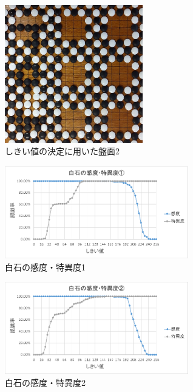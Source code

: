 \documentclass[openright]{nitocs}
\numberwithin{equation}{section}
\begin{document}
            \begin{figure}[tb] %
                \begin{center}
                \includegraphics[clip,width=60mm]{DSC_0100/boardImg.jpg} 
                \caption{しきい値の決定に用いた盤面2}
                \label{DSC0100}
                \end{center}
            \end{figure}

            \begin{figure}[tb] %
                \begin{center}
                \includegraphics[clip,width=80mm]{Case1_White_TPF_TNF.eps} 
                \caption{白石の感度・特異度1}
                \label{Case1White}
                \end{center}
            \end{figure}
            
            \begin{figure}[tb] %
                \begin{center}
                \includegraphics[clip,width=80mm]{Case2_White_TPF_TNF.eps} 
                \caption{白石の感度・特異度2}
                \label{Case2White}
                \end{center}
            \end{figure}
\end{document}
